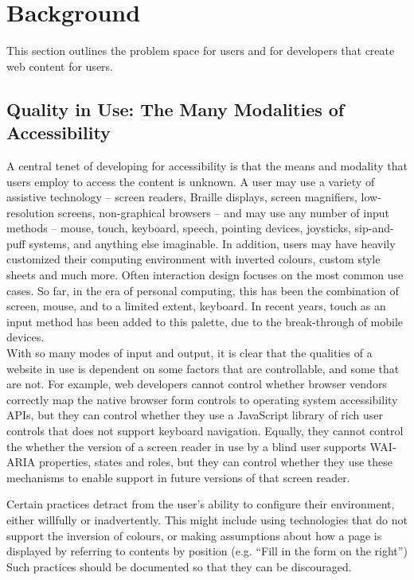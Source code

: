 \section{Background} %
\label{sec:problem_space}

This section outlines the problem space for users and for developers that create web content for users.

\subsection{Quality in Use: The Many Modalities of Accessibility} %
\label{sub:access_methods}

A central tenet of developing for accessibility is that the means and modality that users employ to access the content is unknown. A user may use a variety of assistive technology -- screen readers, Braille displays, screen magnifiers, low-resolution screens, non-graphical browsers -- and may use any number of input methods -- mouse, touch, keyboard, speech, pointing devices, joysticks, sip-and-puff systems, and anything else imaginable. In addition, users may have heavily customized their computing environment with inverted colours, custom style sheets and much more. Often interaction design focuses on the most common use cases. So far, in the era of personal computing, this has been the combination of screen, mouse, and to a limited extent, keyboard. In recent years, touch as an input method has been added to this palette, due to the break-through of mobile devices. \\

With so many modes of input and output, it is clear that the qualities of a website in use is dependent on some factors that are controllable, and some that are not. For example, web developers cannot control whether browser vendors correctly map the native browser form controls to operating system accessibility APIs, but they   can control whether they use a JavaScript library of rich user controls that does not support keyboard navigation. Equally, they cannot control the whether the version of a screen reader in use by a blind user supports \ac{WAI-ARIA} properties, states and roles, but they can control whether they use these mechanisms to enable support in future versions of that screen reader.

Certain practices detract from the user's ability to configure their environment, either willfully or inadvertently. This might include using technologies that do not support the inversion of colours, or making assumptions about how a page is displayed by referring to contents by position (e.g. ``Fill in the form on the right'')
Such practices should be documented so that they can be discouraged.

